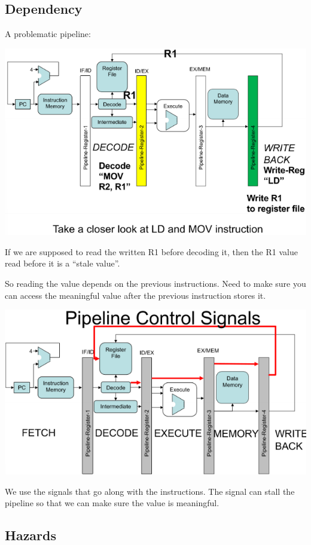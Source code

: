 \documentclass[letterpaper,12pt]{article}
\begin{document}
\subsection{Dependency}

A problematic pipeline:

\includegraphics*[scale = 0.7]{./Image/Problematic pipeline.png}

If we are supposed to read the written R1 before decoding it, then the R1 value read before it is a ``stale value''.

So reading the value depends on the previous instructions. Need to make sure you can access the meaningful value after the previous instruction stores it.

\includegraphics*[scale = 0.7]{./Image/pipeline control signal.png}

We use the signals that go along with the instructions. The signal can stall the pipeline so that we can make sure the value is meaningful.

\subsection{Hazards}
\end{document}
